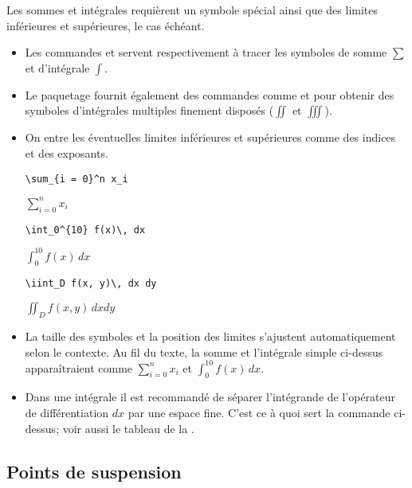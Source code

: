 Les sommes et intégrales requièrent un symbole spécial ainsi que des
limites inférieures et supérieures, le cas échéant.
\begin{itemize}
\item Les commandes \cmd{\sum} et \cmd{\int} servent respectivement à tracer les
  symboles de somme $\sum$ et d'intégrale $\int$.
\item Le paquetage  fournit également des commandes comme
  \cmd{\iint} et \cmd{\iiint} pour obtenir des symboles d'intégrales
  multiples finement disposés ($\iint$ et $\iiint$).
\item On entre les éventuelles limites inférieures et supérieures
  comme des indices et des exposants.
  \begin{demo}
    \begin{texample}
\begin{lstlisting}
\sum_{i = 0}^n x_i
\end{lstlisting}
      \producing
      $\displaystyle \sum_{i = 0}^n x_i$
    \end{texample}

    \begin{texample}
\begin{lstlisting}
\int_0^{10} f(x)\, dx
\end{lstlisting}
      \producing
      $\displaystyle \int_0^{10} f(x)\, dx$
    \end{texample}

    \begin{texample}
\begin{lstlisting}
\iint_D f(x, y)\, dx dy
\end{lstlisting}
      \producing
      $\displaystyle \iint_D f(x, y)\, dx dy$
    \end{texample}
  \end{demo}
\item La taille des symboles et la position des limites s'ajustent
  automatiquement selon le contexte. Au fil du texte, la somme et
  l'intégrale simple ci-dessus apparaîtraient comme
  $\sum_{i = 0}^n x_i$ et $\int_0^{10} f(x)\, dx$.
\item Dans une intégrale il est recommandé de séparer l'intégrande de
  l'opérateur de différentiation $dx$ par une espace fine. C'est ce à
  quoi sert la commande \cmd{\,} ci-dessus; voir aussi le tableau de
  la .
\end{itemize}

\subsection{Points de suspension}
\label{sec:math:bases:dots}

